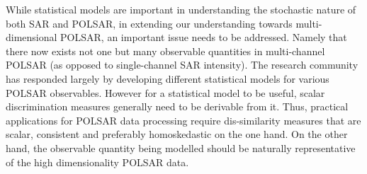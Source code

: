 \documentclass[journal]{IEEEtran}
\begin{document}


While statistical models are important in understanding the stochastic nature of both SAR and POLSAR, in extending our understanding towards multi-dimensional POLSAR, an important issue needs to be addressed.
Namely that there now exists not one but many observable quantities in multi-channel POLSAR (as opposed to single-channel SAR intensity).
The research community has responded largely by developing different statistical models for various POLSAR observables.
However for a statistical model to be useful, scalar discrimination measures generally need to be derivable from it.
Thus, practical applications for POLSAR data processing require dis-similarity measures that are scalar, consistent and preferably homoskedastic on the one hand.
On the other hand, the observable quantity being modelled should be naturally representative of the high dimensionality POLSAR data.
\end{document}
